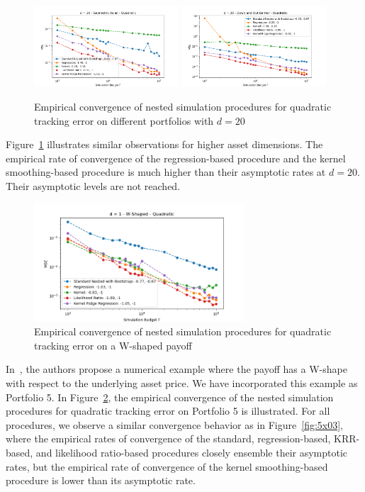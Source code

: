 \documentclass{article}
\begin{document}
\begin{figure}[ht!] 
    \centering
    \includegraphics[width=0.48\textwidth]{./figures/convergence/1203.png}
    \includegraphics[width=0.48\textwidth]{./figures/convergence/1403.png}
    \caption{Empirical convergence of nested simulation procedures for quadratic tracking error on different portfolios with $d=20$}
    \label{fig:1x03} 
\end{figure}

Figure~\ref{fig:1x03} illustrates similar observations for higher asset dimensions.
The empirical rate of convergence of the regression-based procedure and the kernel smoothing-based procedure is much higher than their asymptotic rates at $d=20$. 
Their asymptotic levels are not reached. 

\begin{figure}[ht!] 
    \centering
    \includegraphics[width=0.7\textwidth]{./figures/convergence/5503.png}
    \caption{Empirical convergence of nested simulation procedures for quadratic tracking error on a W-shaped payoff}
    \label{fig:5503} 
\end{figure}

In~\cite{broadie2015risk}, the authors propose a numerical example where the payoff has a W-shape with respect to the underlying asset price.
We have incorporated this example as Portfolio 5.
In Figure~\ref{fig:5503}, the empirical convergence of the nested simulation procedures for quadratic tracking error on Portfolio 5 is illustrated.
For all procedures, we observe a similar convergence behavior as in Figure~\ref{fig:5x03}, where the empirical rates of convergence of the standard, regression-based, KRR-based, and likelihood ratio-based procedures closely ensemble their asymptotic rates, but the empirical rate of convergence of the kernel smoothing-based procedure is lower than its asymptotic rate.
\end{document}
